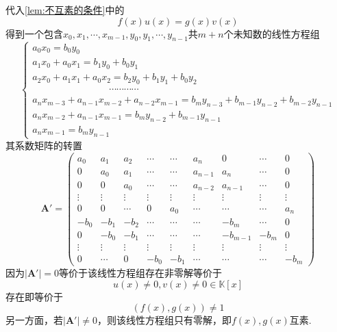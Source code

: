 代入\cref{lem:不互素的条件}中的\[f\left(x\right)u\left(x\right)=g\left(x\right)v\left(x\right)\]得到一个包含$x_0,x_1,\cdots,x_{m-1},y_0,y_1,\cdots,y_{n-1}$共$m+n$个未知数的线性方程组
\[
    \begin{cases*}
        a_0x_0=  b_0y_0                                      \\
        a_1x_0+a_0x_1=b_1y_0+b_0y_1                          \\
        a_2x_0+a_1x_1+a_0x_2=b_2y_0+b_1y_1+b_0y_2            \\
        \qquad \qquad   \qquad\qquad\cdots\cdots\cdots\cdots \\
        a_nx_{m-3}+a_{n-1}x_{m-2}+a_{n-2}x_{m-1}=
        b_m y_{n-3}+b_{m-1}y_{n-2}+b_{m-2}y_{n-1}            \\
        a_nx_{m-2}+a_{n-1}x_{m-1}=b_m y_{n-2}+b_{m-1}y_{n-1} \\
        a_nx_{m-1}=b_m y_{n-1}
    \end{cases*}
\]
其系数矩阵的转置
\[
    \bm{A}'=\begin{pmatrix}
        a_0    & a_1    & a_2    & \cdots & \cdots & a_n     & 0        & \cdots & 0      \\
        0      & a_0    & a_1    & \cdots & \cdots & a_{n-1} & a_n      & \cdots & 0      \\
        0      & 0      & a_0    & \cdots & \cdots & a_{n-2} & a_{n-1}  & \cdots & 0      \\
        \vdots & \vdots & \vdots & \vdots & \vdots & \vdots  & \vdots   & \vdots & \vdots \\
        0      & 0      & \cdots & 0      & a_0    & \cdots  & \cdots   & \cdots & a_n    \\
        -b_0   & -b_1   & -b_2   & \cdots & \cdots & \cdots  & -b_{m}   & \cdots & 0      \\
        0      & -b_0   & -b_1   & \cdots & \cdots & \cdots  & -b_{m-1} & -b_m   & 0      \\
        \vdots & \vdots & \vdots & \vdots & \vdots & \vdots  & \vdots   & \vdots & \vdots \\
        0      & \cdots & 0      & -b_0   & -b_1   & \cdots  & \cdots   & \cdots & -b_m
    \end{pmatrix}
\]
因为$\left|\bm{A}'\right|=0$等价于该线性方程组存在非零解等价于
\[u\left(x\right)\neq 0,v\left(x\right)\neq 0\in\mathbb{K}\left[x\right]\]存在即等价于\[
    \left(
    f\left(x\right),g\left(x\right)
    \right)\neq 1
\]另一方面，若$\left|\bm{A}'\right|\neq 0$，则该线性方程组只有零解，即$f\left(x\right),g\left(x\right)$互素.
